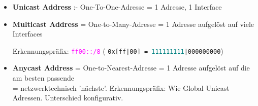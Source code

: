 \begin{frame}
\begin{footnotesize}
\begin{tiny}
  \begin{itemize}
    \item \textbf{Unicast Address} :- One-To-One-Adresse = 1 Adresse, 1 Interface

    \item \textbf{Multicast Address} = One-to-Many-Adresse = 1 Adresse aufgelöst auf viele Interfaces\\
    \begin{tiny}{Erkennungspräfix: \textcolor{magenta}{\texttt{ff00::/8}} 
      ( \texttt{0x[ff|00] = \textcolor{teal}{111111111}|000000000})}
    \end{tiny}

    \item \textbf{Anycast Address} = One-to-Nearest-Adresse = 1 Adresse aufgelöst auf die am besten passende\\
    = netzwerktechnisch 'nächste'. Erkennungspräfix: Wie Global Unicast Adressen. Unterschied konfigurativ.

  \end{itemize}
  \end{tiny}

  \end{footnotesize}
\end{frame}

